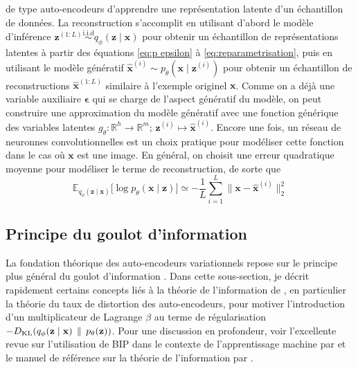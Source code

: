 de type auto-encodeurs d'apprendre une représentation latente d'un échantillon de données.
La reconstruction s'accomplit en utilisant d'abord le modèle d'inférence 
$\mathbf{z}^{(1:L)} \overset{\mathrm{i.i.d}}{\sim} q_\phi(\mathbf{z} \mid \mathbf{x})$ 
pour obtenir un échantillon de représentations latentes à partir des équations \eqref{eq:p epsilon} à \eqref{eq:reparametrisation}, 
puis en utilisant le modèle génératif $\hat{\mathbf{x}}^{(i)} \sim p_\theta(\mathbf{x} \mid \mathbf{z}^{(i)})$ pour obtenir 
un échantillon de reconstructions $\mathbf{\hat{x}}^{(1:L)}$ similaire à l'exemple originel $\mathbf{\mathbf{x}}$. 
Comme on a déjà une variable auxiliaire $\boldsymbol{ \epsilon} $ 
qui se charge de l'aspect génératif du modèle, on peut construire une approximation du 
modèle génératif avec une fonction générique des variables latentes 
${g_\theta: \mathbb{R}^{h} \rightarrow \mathbb{R}^{m};\, \mathbf{z}^{(i)} \mapsto \hat{\mathbf{x}}^{(i)}}$.
Encore une fois, un réseau de neuronnes convolutionnelles est un choix pratique pour modéliser cette fonction 
dans le cas où $\mathbf{x}$ est une image. En général, on choisit une erreur quadratique moyenne pour modéliser le terme de reconstruction, 
de sorte que
\begin{equation}\label{eq:reconstruction}
        \mathbb{E}_{q_\phi(\mathbf{z} \mid \mathbf{x})} \bigg[
                \log p_\theta(\mathbf{x} \mid \mathbf{z})
        \bigg] 
        \simeq -\frac{1}{L}\sum_{i=1}^{L} \lVert \mathbf{x} - \hat{\mathbf{x}}^{(i)} \rVert_2^{2}
\end{equation} 

\subsection{Principe du goulot d'information}

La fondation théorique des auto-encodeurs variationnels repose sur le principe plus général 
du goulot d'information \citep[BIP, de l'anglais \textit{bottleneck information principle:}][]{Tishby1999}. 
Dans cette sous-section, je décrit rapidement certains concepts 
liés à la théorie de l'information de \citet{Shannon1948}, en particulier la théorie du taux de distortion des auto-encodeurs,
pour motiver l'introduction d'un multiplicateur de 
Lagrange $\beta$ au terme de régularisation ${-D_{\mathrm{KL}}(q_\phi(\mathbf{z} \mid \mathbf{x})\, \mathrel{\Vert}\, p_\theta(\mathbf{z}))}$.
Pour une discussion en profondeur, voir l'excellente revue sur l'utilisation de BIP dans le contexte de l'apprentissage 
machine par \citet{Goldfield2020} et le manuel de référence sur la théorie de l'information par \citet{Cover2006}.


